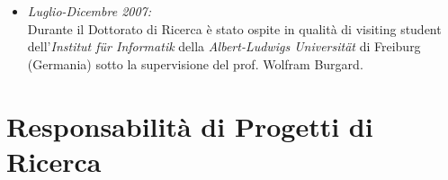 \documentclass[11pt]{article}
\newcommand{\ITEMDATE}[1]{\item \textit{#1:}\\}
\begin{document}
\begin{itemize}

\ITEMDATE{Luglio-Dicembre 2007} 
Durante il Dottorato di Ricerca \`e stato ospite in qualit\`a di visiting student 
dell'\textit{Institut f\"ur Informatik} della \textit{Albert-Ludwigs Universit\"at} 
di Freiburg (Germania) sotto la supervisione del prof. Wolfram Burgard.

\end{itemize}


\section*{Responsabilit\`a di Progetti di Ricerca}
\end{document}
